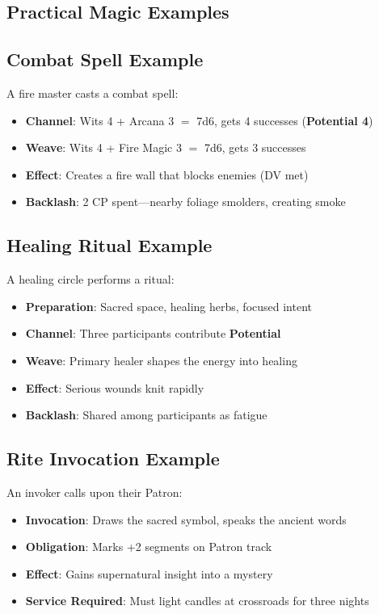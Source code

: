 \begin{multicols}{2}
\section{Practical Magic Examples} 

\subsection*{Combat Spell Example}
A fire master casts a combat spell:
\begin{itemize}
\item \textbf{Channel}: Wits 4 + Arcana 3 $=$ 7d6, gets 4 successes (\textbf{Potential 4})
\item \textbf{Weave}: Wits 4 + Fire Magic 3 $=$ 7d6, gets 3 successes
\item \textbf{Effect}: Creates a fire wall that blocks enemies (DV met)
\item \textbf{Backlash}: 2 CP spent—nearby foliage smolders, creating smoke
\end{itemize}

\subsection*{Healing Ritual Example}
A healing circle performs a ritual:
\begin{itemize}
\item \textbf{Preparation}: Sacred space, healing herbs, focused intent
\item \textbf{Channel}: Three participants contribute \textbf{Potential}
\item \textbf{Weave}: Primary healer shapes the energy into healing
\item \textbf{Effect}: Serious wounds knit rapidly
\item \textbf{Backlash}: Shared among participants as fatigue
\end{itemize}

\subsection*{Rite Invocation Example}
An invoker calls upon their Patron:
\begin{itemize}
\item \textbf{Invocation}: Draws the sacred symbol, speaks the ancient words
\item \textbf{Obligation}: Marks +2 segments on Patron track
\item \textbf{Effect}: Gains supernatural insight into a mystery
\item \textbf{Service Required}: Must light candles at crossroads for three nights
\end{itemize}


\end{multicols}
